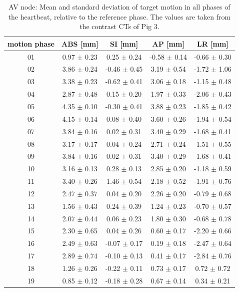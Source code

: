 \documentclass[type=dr, dr=rernat, accentcolor=tud7b,colorbacktitle, bigchapter, openright, twoside, 12pt ]{tudthesis}
\begin{document}
\newpage

\begin{table}[H]
  \centering
  \scriptsize
  \caption{AV node: Mean and standard deviation of target motion in all phases of the heartbeat, relative to the reference phase. The values are 
  taken from the contrast CTs of Pig 3.}
  \begin{tabular}{|c|c|c|c|c|}
    \hline\hline
    motion phase\rule{0pt}{2.6ex}\rule[-1.2ex]{0pt}{0pt} & ABS [mm] & SI [mm] & AP [mm] & LR [mm]\\
    \hline
01 &0.97 $\pm$ 0.23 &0.25 $\pm$ 0.24 &-0.58 $\pm$ 0.14 &-0.66 $\pm$ 0.30 \\
02 &3.86 $\pm$ 0.24 &-0.46 $\pm$ 0.45 &3.19 $\pm$ 0.54 &-1.72 $\pm$ 1.06 \\
03 &3.38 $\pm$ 0.23 &-0.62 $\pm$ 0.41 &3.06 $\pm$ 0.18 &-1.15 $\pm$ 0.48 \\
04 &2.87 $\pm$ 0.48 &0.15 $\pm$ 0.20 &1.97 $\pm$ 0.33 &-2.06 $\pm$ 0.43 \\
05 &4.35 $\pm$ 0.10 &-0.30 $\pm$ 0.41 &3.88 $\pm$ 0.23 &-1.85 $\pm$ 0.42 \\
06 &4.15 $\pm$ 0.14 &0.08 $\pm$ 0.40 &3.60 $\pm$ 0.26 &-1.94 $\pm$ 0.54 \\
07 &3.84 $\pm$ 0.16 &0.02 $\pm$ 0.31 &3.40 $\pm$ 0.29 &-1.68 $\pm$ 0.41 \\
08 &3.17 $\pm$ 0.17 &0.04 $\pm$ 0.24 &2.71 $\pm$ 0.24 &-1.51 $\pm$ 0.55 \\
09 &3.84 $\pm$ 0.16 &0.02 $\pm$ 0.31 &3.40 $\pm$ 0.29 &-1.68 $\pm$ 0.41 \\
10 &3.16 $\pm$ 0.13 &0.28 $\pm$ 0.13 &2.85 $\pm$ 0.20 &-1.18 $\pm$ 0.59 \\
11 &3.40 $\pm$ 0.26 &1.46 $\pm$ 0.54 &2.18 $\pm$ 0.52 &-1.91 $\pm$ 0.76 \\
12 &2.47 $\pm$ 0.37 &0.04 $\pm$ 0.20 &2.26 $\pm$ 0.20 &-0.79 $\pm$ 0.68 \\
13 &1.56 $\pm$ 0.43 &0.24 $\pm$ 0.39 &1.24 $\pm$ 0.23 &-0.70 $\pm$ 0.57 \\
14 &2.07 $\pm$ 0.44 &0.06 $\pm$ 0.23 &1.80 $\pm$ 0.30 &-0.68 $\pm$ 0.78 \\
15 &2.30 $\pm$ 0.65 &0.04 $\pm$ 0.26 &0.60 $\pm$ 0.17 &-2.20 $\pm$ 0.66 \\
16 &2.49 $\pm$ 0.63 &-0.07 $\pm$ 0.17 &0.19 $\pm$ 0.18 &-2.47 $\pm$ 0.64 \\
17 &2.89 $\pm$ 0.74 &-0.10 $\pm$ 0.13 &0.41 $\pm$ 0.17 &-2.84 $\pm$ 0.76 \\
18 &1.26 $\pm$ 0.26 &-0.22 $\pm$ 0.11 &0.73 $\pm$ 0.17 &0.72 $\pm$ 0.72 \\
19 &0.85 $\pm$ 0.12 &-0.18 $\pm$ 0.28 &0.67 $\pm$ 0.14 &0.34 $\pm$ 0.21 \\
    \hline\hline
  \end{tabular}
  \label{tab:motion:AV:Pig3}
\end{table}
\end{document}
